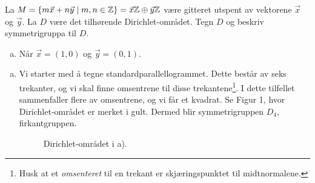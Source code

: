 \documentclass[11pt, norsk]{article}
\begin{document}
\begin{oppg}
  La $M= \{ m \vec x + n \vec y \mid m,n \in \mathbb{Z} \}=\vec x \mathbb{Z} \oplus \vec y \mathbb{Z}$ være gitteret utspent av vektorene $\vec x$ og $\vec y$. La $D$ være det tilhørende Dirichlet-området. Tegn $D$ og beskriv symmetrigruppa til $D$.
  \begin{enumerate}[a)]
  \item Når $\vec x = (1,0)$ og $\vec y = (0,1)$.
  \end{enumerate}
\end{oppg}
\begin{losn}
  \begin{enumerate}[a)]
  \item Vi starter med å tegne standardparallellogrammet. Dette består av seks trekanter, og vi skal finne omsentrene til disse trekantene\footnote{Husk at et \emph{omsenteret} til en trekant er skjæringspunktet til midtnormalene.}. I dette tilfellet sammenfaller flere av omsentrene, og vi får et kvadrat. Se Figur 1, hvor Dirichlet-området er merket i gult. Dermed blir symmetrigruppen $D_4$, firkantgruppen.
\begin{figure}[h]
\begin{center}
\end{center}
\caption{Dirichlet-området i a).}
\end{figure}


\end{enumerate}
\end{losn}
\end{document}
